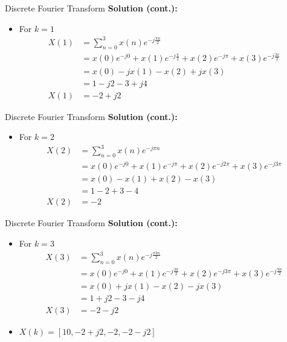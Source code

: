 \documentclass[pdflatex,compress,mathserif]{beamer}
\begin{document}
\begin{frame}[fragile]{Discrete Fourier Transform}
    \textbf{Solution (cont.):}
    \begin{itemize}
        \item For $k = 1$
        \begin{align*}
            X(1) &= \sum_{n=0}^{3} x(n)e^{-j\frac{\pi n}{2}} \\
            &= x(0)e^{-j0} + x(1)e^{-j\frac{\pi}{2}} + x(2)e^{-j \pi} + x(3)e^{-j\frac{3\pi}{2}} \\
            &= x(0) - jx(1) - x(2) + jx(3) \\
            &= 1 - j2 - 3 + j4 \\
            X(1) &= -2 + j2
        \end{align*}
    \end{itemize}
\end{frame}

\begin{frame}[fragile]{Discrete Fourier Transform}
    \textbf{Solution (cont.):}
    \begin{itemize}
        \item For $k = 2$
        \begin{align*}
            X(2) &= \sum_{n=0}^{3} x(n)e^{-j \pi n} \\
            &= x(0)e^{-j0} + x(1)e^{-j\pi} + x(2)e^{-j2\pi} + x(3)e^{-j3\pi} \\
            &= x(0) - x(1) + x(2) - x(3) \\
            &= 1 - 2 + 3 - 4 \\
            X(2) &= -2
        \end{align*}
    \end{itemize}
\end{frame}

\begin{frame}[fragile]{Discrete Fourier Transform}
    \textbf{Solution (cont.):}
    \begin{itemize}
        \item For $k = 3$
        \begin{align*}
            X(3) &= \sum_{n=0}^{3} x(n)e^{-j\frac{\pi 3n}{2}} \\
            &= x(0)e^{-j0} + x(1)e^{-j \frac{3\pi}{2}} + x(2)e^{-j 3\pi} + x(3)e^{-j\frac{9\pi}{2}} \\
            &= x(0) + jx(1) - x(2) - jx(3) \\
            &= 1 + j2 - 3 - j4 \\
            X(3) &= -2 - j2
        \end{align*}
        \item $X(k) = [10, -2+j2, -2, -2 - j2]$
    \end{itemize}
\end{frame}
\end{document}
